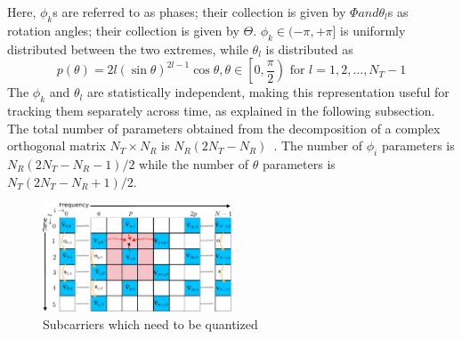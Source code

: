 \documentclass[conference]{IEEEtran}
\begin{document}
Here, $\phi_{k}$s are referred to as phases; their collection is given by $\Phi and $$\theta_{l}$s as rotation angles; their collection is given by $\Theta$. $\phi_k \in (-\pi, + \pi]$ is uniformly distributed
between the two extremes\cite{4114278}, while $\theta_l$
is distributed as
\begin{equation}
p(\theta) = 2l(\sin\theta)^{2l-1}\cos\theta, \theta \in \left[0, \frac{\pi}{2}\right) \mbox{ for } l = 1,2,\ldots,N_T -1
\end{equation}
The $\phi_k$ and $\theta_l$ are statistically independent, making this
representation useful for tracking them separately across time, as
explained in the following subsection. The total number of parameters
obtained from the decomposition of a complex orthogonal matrix
$N_{T} \times N_{R} $ is $N_{R}(2N_{T} - N_{R})$~\cite{4114278}. The
number of $\phi_i$ parameters is $N_{R}(2N_{T} - N_{R}-1)/2$ while the
number of $\theta$ parameters is $N_{T}(2N_{T} - N_{R}+1)/2$.
\begin{figure}
\includegraphics[width=0.5\textwidth]{images/new-adpm.pdf}
\caption{\label{fig:adpm-fig}Subcarriers which need to be quantized}
\label{ber_overvie}
\vspace{-5pt}
\end{figure}
\end{document}

